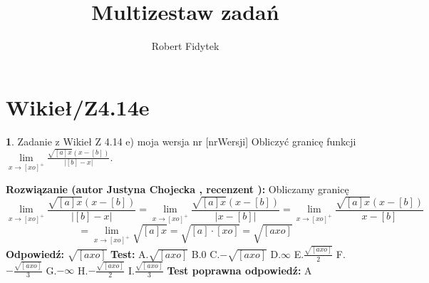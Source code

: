 \documentclass[12pt, a4paper]{article}
\title{Multizestaw zadań}
\author{Robert Fidytek}
\date{}
\theoremstyle{definition} %
\newtheorem{zad}{}
\newcommand{\kategoria}[1]{\section{#1}} %
\newcommand{\zadStart}[1]{\begin{zad}#1\newline} %
\newcommand{\zadStop}{\end{zad}}   %
\newcommand{\rozwStart}[2]{\noindent \textbf{Rozwiązanie (autor #1 , recenzent #2): }\newline} %
\newcommand{\rozwStop}{\newline}                                            %
\newcommand{\odpStart}{\noindent \textbf{Odpowiedź:}\newline}    %
\newcommand{\odpStop}{\newline}                                             %
\newcommand{\testStart}{\noindent \textbf{Test:}\newline} %
\newcommand{\testStop}{\newline} %
\newcommand{\kluczStart}{\noindent \textbf{Test poprawna odpowiedź:}\newline} %
\newcommand{\kluczStop}{\newline} %
\begin{document}
\maketitle


\kategoria{Wikieł/Z4.14e}
\zadStart{Zadanie z Wikieł Z 4.14 e) moja wersja nr [nrWersji]}
Obliczyć granicę funkcji $\lim\limits_{x\to [xo]^{+}}\frac{\sqrt{[a]x}(x-[b])}{|[b]-x|}$. 
\zadStop
\rozwStart{Justyna Chojecka}{}
Obliczamy granicę
$$\lim\limits_{x\to [xo]^{+}}\frac{\sqrt{[a]x}(x-[b])}{|[b]-x|}=\lim\limits_{x\to [xo]^{+}}\frac{\sqrt{[a]x}(x-[b])}{|x-[b]|}=\lim\limits_{x\to [xo]^{+}}\frac{\sqrt{[a]x}(x-[b])}{x-[b]}$$$$=\lim\limits_{x\to [xo]^{+}}\sqrt{[a]x}=\sqrt{[a]\cdot[xo]}=\sqrt{[axo]}$$
\rozwStop
\odpStart
$\sqrt{[axo]}$
\odpStop
\testStart
A.$\sqrt{[axo]}$
B.$0$
C.$-\sqrt{[axo]}$
D.$\infty$
E.$\frac{\sqrt{[axo]}}{2}$
F.$-\frac{\sqrt{[axo]}}{3}$
G.$-\infty$
H.$-\frac{\sqrt{[axo]}}{2}$
I.$\frac{\sqrt{[axo]}}{3}$
\testStop
\kluczStart
A
\kluczStop
\end{document}
